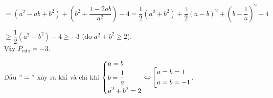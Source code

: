 \begin{ex}
{\begin{enumerate}
  \hspace{1.4cm} $= (a^2 - ab + b^2) + \left(b^2 + \dfrac{1 - 2ab}{a^2}\right) - 4 = \dfrac{1}{2}(a^2 + b^2) + \dfrac{1}{2}(a - b)^2 + \left(b - \dfrac{1}{a}\right)^2 - 4$
    
    \hspace{1.4cm} $\geq \dfrac{1}{2}(a^2 + b^2) - 4 \geq -3$ (do $a^2 + b^2 \geq 2$).\\
    Vậy $P_{\min} = -3$.
    
    Dấu $"="$ xảy ra khi và chỉ khi $\left\{\begin{aligned}& a = b\\& b = \dfrac{1}{a}\\& a^2 + b^2 = 2\end{aligned}\right. \Leftrightarrow \left[\begin{aligned}&a = b = 1\\& a = b = -1\end{aligned}\right.$.
   \end{enumerate}
    }
\end{ex}

